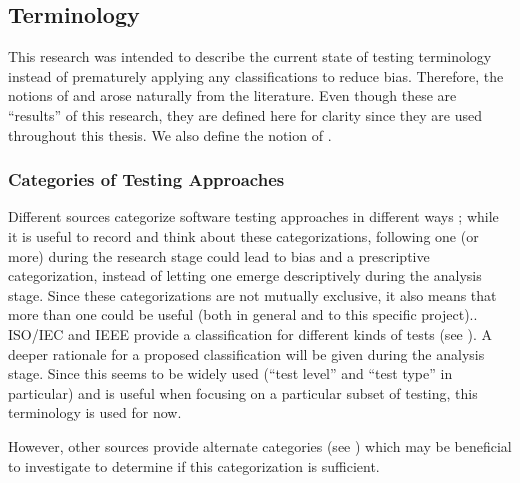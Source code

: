 \subsection{Terminology}

This research was intended to describe the current state of testing
terminology instead of prematurely applying any classifications to reduce bias.
Therefore, the notions of  and 
arose naturally from the literature. Even though these are ``results'' of this
research, they are defined here for clarity since they are used throughout this
thesis. We also define the notion of .

\subsubsection{Categories of Testing Approaches}
\label{categories-observ}

Different sources categorize software testing approaches in different ways%
\ifnotpaper
    ; while it is useful to record and think about these
    categorizations, following one (or more)
    during the research
    stage could lead to bias and a prescriptive categorization, instead of letting
    one emerge descriptively during the analysis stage. Since these categorizations
    are not mutually exclusive, it also means that more than one could be useful
    (both in general and to this specific project).\newline \else.\fi\
\ifnotpaper \citet{IEEE2022} \else ISO/IEC and IEEE \cite{IEEE2022} \fi provide
a classification for different kinds of tests (see \refIEEETestTerms{}).
\ifnotpaper A deeper rationale for a proposed classification will be given
    during the analysis stage. \else Since
    this seems to be widely used (``test level'' and ``test type'' in particular)
    and is useful when focusing on a particular subset of testing, this terminology
    is used for now. \fi

\ifnotpaper
    However, other sources \citep{BarbosaEtAl2006, SouzaEtAl2017}
    provide alternate categories
    (see ) which may be beneficial to investigate to
    determine if this categorization is sufficient.


